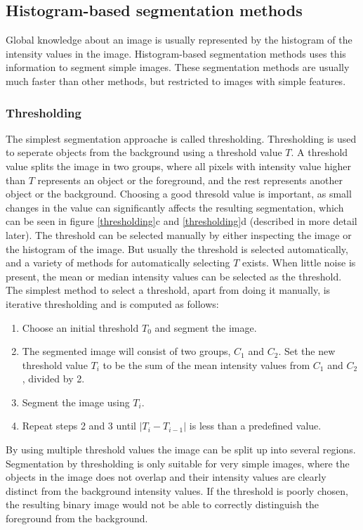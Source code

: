 \subsection{Histogram-based segmentation methods}
Global knowledge about an image is usually represented by the histogram of the intensity values in the image. Histogram-based segmentation methods uses this information to segment simple images. These segmentation methods are usually much faster than other methods, but restricted to images with simple features. 

\subsubsection{Thresholding}
The simplest segmentation approache is called thresholding. Thresholding is used to seperate objects from the background using a threshold value \(T\). A threshold value splits the image in two groups, where all pixels with intensity value higher than \(T\) represents an object or the foreground, and the rest represents another object or the background. Choosing a good thresold value is important, as small changes in the value can significantly affects the resulting segmentation, which can be seen in figure \ref{thresholding}c and \ref{thresholding}d (described in more detail later). The threshold can be selected manually by either inspecting the image or the histogram of the image. But usually the threshold is selected automatically, and a variety of methods for automatically selecting \(T\) exists. When little noise is present, the mean or median intensity values can be selected as the threshold. The simplest method to select a threshold, apart from doing it manually, is iterative thresholding and is computed as follows:
\begin{enumerate}
\item Choose an initial threshold \(T_{0}\) and segment the image.
\item The segmented image will consist of two groups, \(C_{1}\) and \(C_{2}\). Set the new threshold value \(T_{i}\) to be the sum of the mean intensity values from \(C_{1}\) and \(C_{2}\), divided by 2.
\item Segment the image using \(T_{i}\).
\item Repeat steps 2 and 3 until \(|T_{i} - T_{i-1}|\) is less than a predefined value.
\end{enumerate}
 
By using multiple threshold values the image can be split up into several regions. Segmentation by thresholding is only suitable for very simple images, where the objects in the image does not overlap and their intensity values are clearly distinct from the background intensity values. If the threshold is poorly chosen, the resulting binary image would not be able to correctly distinguish the foreground from the background.  

